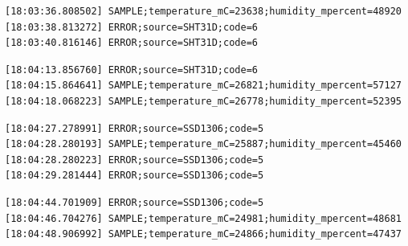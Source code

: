 \begin{verbatim}
[18:03:36.808502] SAMPLE;temperature_mC=23638;humidity_mpercent=48920
[18:03:38.813272] ERROR;source=SHT31D;code=6
[18:03:40.816146] ERROR;source=SHT31D;code=6
\end{verbatim}
\begin{verbatim}
[18:04:13.856760] ERROR;source=SHT31D;code=6
[18:04:15.864641] SAMPLE;temperature_mC=26821;humidity_mpercent=57127
[18:04:18.068223] SAMPLE;temperature_mC=26778;humidity_mpercent=52395
\end{verbatim}
\begin{verbatim}
[18:04:27.278991] ERROR;source=SSD1306;code=5
[18:04:28.280193] SAMPLE;temperature_mC=25887;humidity_mpercent=45460
[18:04:28.280223] ERROR;source=SSD1306;code=5
[18:04:29.281444] ERROR;source=SSD1306;code=5
\end{verbatim}
\begin{verbatim}
[18:04:44.701909] ERROR;source=SSD1306;code=5
[18:04:46.704276] SAMPLE;temperature_mC=24981;humidity_mpercent=48681
[18:04:48.906992] SAMPLE;temperature_mC=24866;humidity_mpercent=47437
\end{verbatim}
